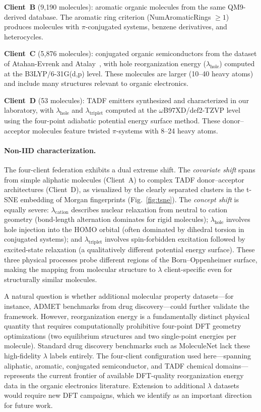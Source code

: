 \documentclass[twocolumn]{article}
\newcommand{\lam}{\lambda}
\newcommand{\lamhole}{\lambda_{\text{hole}}}
\newcommand{\lamcat}{\lambda_{\text{cation}}}
\newcommand{\lamtrip}{\lambda_{\text{triplet}}}
\begin{document}
\textbf{Client~B} (9{,}190 molecules): aromatic organic molecules from the same QM9-derived database.
The aromatic ring criterion (NumAromaticRings $\geq 1$) produces molecules with $\pi$-conjugated systems, benzene derivatives, and heterocycles.

\textbf{Client~C} (5{,}876 molecules): conjugated organic semiconductors from the dataset of Atahan-Evrenk and Atalay~\cite{AtahanEvrenk2019_RE}, with hole reorganization energy ($\lamhole$) computed at the B3LYP/6-31G(d,p) level.
These molecules are larger (10--40 heavy atoms) and include many structures relevant to organic electronics.

\textbf{Client~D} (53 molecules): TADF emitters synthesized and characterized in our laboratory, with $\lamhole$ and $\lamtrip$ computed at the $\omega$B97XD/def2-TZVP level using the four-point adiabatic potential energy surface method.
These donor--acceptor molecules feature twisted $\pi$-systems with 8--24 heavy atoms.

\paragraph{Non-IID characterization.}
The four-client federation exhibits a dual extreme shift.
The \emph{covariate shift} spans from simple aliphatic molecules (Client~A) to complex TADF donor--acceptor architectures (Client~D), as visualized by the clearly separated clusters in the t-SNE embedding of Morgan fingerprints (Fig.~\ref{fig:tsne}).
The \emph{concept shift} is equally severe: $\lamcat$ describes nuclear relaxation from neutral to cation geometry (bond-length alternation dominates for rigid molecules); $\lamhole$ involves hole injection into the HOMO orbital (often dominated by dihedral torsion in conjugated systems); and $\lamtrip$ involves spin-forbidden excitation followed by excited-state relaxation (a qualitatively different potential energy surface).
These three physical processes probe different regions of the Born--Oppenheimer surface, making the mapping from molecular structure to $\lam$ client-specific even for structurally similar molecules.

A natural question is whether additional molecular property datasets---for instance, ADMET benchmarks from drug discovery---could further validate the framework.
However, reorganization energy is a fundamentally distinct physical quantity that requires computationally prohibitive four-point DFT geometry optimizations (two equilibrium structures and two single-point energies per molecule).
Standard drug discovery benchmarks such as MoleculeNet lack these high-fidelity $\lam$ labels entirely.
The four-client configuration used here---spanning aliphatic, aromatic, conjugated semiconductor, and TADF chemical domains---represents the current frontier of available DFT-quality reorganization energy data in the organic electronics literature.
Extension to additional $\lam$ datasets would require new DFT campaigns, which we identify as an important direction for future work.
\end{document}
